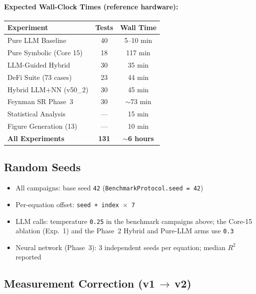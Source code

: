 \documentclass[twoside,11pt]{article}
\begin{document}
\paragraph{Expected Wall-Clock Times (reference hardware):}
\begin{small}
\begin{tabular}{@{}lcc@{}}
\toprule
\textbf{Experiment} & \textbf{Tests} & \textbf{Wall Time} \\
\midrule
Pure LLM Baseline          & 40  & 5--10 min \\
Pure Symbolic (Core 15)    & 18  & 117 min \\
LLM-Guided Hybrid          & 30  & 35 min \\
DeFi Suite (73 cases)      & 23  & 44 min \\
Hybrid LLM+NN (v50\_2)     & 30  & 45 min \\
Feynman SR Phase~3         & 30  & $\sim$73 min \\
Statistical Analysis       & --- & 15 min \\
Figure Generation (13)     & --- & 10 min \\
\midrule
\textbf{All Experiments}   & \textbf{131} & \textbf{$\sim$6 hours} \\
\bottomrule
\end{tabular}
\end{small}

\subsection{Random Seeds}

\begin{itemize}
\item All campaigns: base seed \texttt{42} (\texttt{BenchmarkProtocol.seed = 42})
\item Per-equation offset: \texttt{seed + index $\times$ 7}
\item LLM calls: temperature \texttt{0.25} in the benchmark campaigns above; the Core-15 ablation (Exp.~1) and the Phase~2 Hybrid and Pure-LLM arms use \texttt{0.3}
\item Neural network (Phase~3): 3 independent seeds per equation; median $R^2$ reported
\end{itemize}

\subsection{Measurement Correction (v1\,$\to$\,v2)}
\end{document}
